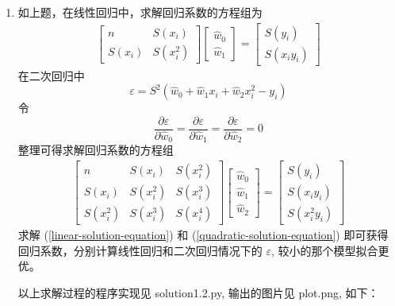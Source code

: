 \documentclass[11pt,letter,notitlepage]{article}
\begin{document}
\begin{solution}
\begin{enumerate}
		\item 如上题，在线性回归中，求解回归系数的方程组为
		      \begin{align}\label{linear-solution-equation}
			      \begin{bmatrix}
				      n      & S(x_i)   \\
				      S(x_i) & S(x_i^2)
			      \end{bmatrix}
			      \begin{bmatrix}
				      \hat{w}_0 \\ \hat{w}_1
			      \end{bmatrix}
			      = \begin{bmatrix}
				      S(y_i) \\ S(x_i y_i)
			      \end{bmatrix}
		      \end{align}
		      在二次回归中
		      $$\varepsilon=S^2(\hat{w}_0+\hat{w}_1 x_i +\hat{w}_2 x_i^2 -y_i)$$
		      令
		      $$\frac{\partial\varepsilon}{\partial\hat{w}_0}
			      =\frac{\partial\varepsilon}{\partial\hat{w}_1}
			      =\frac{\partial\varepsilon}{\partial\hat{w}_2}=0$$
		      整理可得求解回归系数的方程组
		      \begin{align}\label{quadratic-solution-equation}
			      \begin{bmatrix}
				      n        & S(x_i)   & S(x_i^2) \\
				      S(x_i)   & S(x_i^2) & S(x_i^3) \\
				      S(x_i^2) & S(x_i^3) & S(x_i^4)
			      \end{bmatrix}
			      \begin{bmatrix}
				      \hat{w}_0 \\ \hat{w}_1 \\ \hat{w}_2
			      \end{bmatrix}
			      =\begin{bmatrix}
				      S(y_i) \\ S(x_i y_i) \\ S(x_i^2 y_i)
			      \end{bmatrix}
		      \end{align}
		      求解 (\ref{linear-solution-equation}) 和 (\ref{quadratic-solution-equation}) 即可获得回归系数，分别计算线性回归和二次回归情况下的 $\varepsilon$, 较小的那个模型拟合更优。

		      以上求解过程的程序实现见 solution1.2.py, 输出的图片见 plot.png, 如下：


\end{enumerate}
\end{solution}
\end{document}
